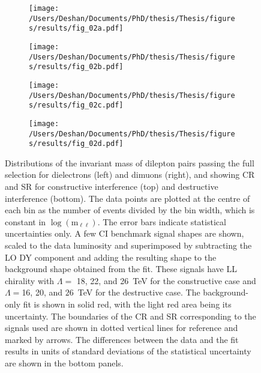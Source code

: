 \begin{figure}[!htpb]
    \centering
    \begin{subfigure}[b]{0.49\textwidth}
        \centering
        \texttt{[image: /Users/Deshan/Documents/PhD/thesis/Thesis/figures/results/fig\_02a.pdf]}
        \label{fig:fits1}
    \end{subfigure}
    \begin{subfigure}[b]{0.49\textwidth}
        \centering
        \texttt{[image: /Users/Deshan/Documents/PhD/thesis/Thesis/figures/results/fig\_02b.pdf]}
        \label{fig:fits2}
    \end{subfigure}
    \begin{subfigure}[b]{0.49\textwidth}
        \centering
        \texttt{[image: /Users/Deshan/Documents/PhD/thesis/Thesis/figures/results/fig\_02c.pdf]}
        \label{fig:fits3}
    \end{subfigure}
    \begin{subfigure}[b]{0.49\textwidth}
        \centering
        \texttt{[image: /Users/Deshan/Documents/PhD/thesis/Thesis/figures/results/fig\_02d.pdf]}
        \label{fig:fits4}
    \end{subfigure}
    \caption[Distributions of the invariant mass of dilepton pairs passing the full selection for dielectrons and dimuons. Where the background-only fit has been performed in the CR and extrapolated to the signal region.]{
    Distributions of the invariant mass of dilepton pairs passing the full selection for dielectrons (left) and dimuons (right), and showing CR and SR for constructive interference (top) and destructive interference (bottom).
    The data points are plotted at the centre of each bin as the number of events divided by the bin width, which is constant in $\log{(\text{m}_{\ell\ell})}$.
    The error bars indicate statistical uncertainties only.
    A few CI benchmark signal shapes are shown, scaled to the data luminosity and superimposed by subtracting the LO DY component and adding the resulting shape to the background shape obtained from the fit.
    These signals have LL chirality with $\Lambda=$ 18, 22, and 26~TeV for the constructive case and $\Lambda=$16, 20, and $26$~TeV for the destructive case.
    The background-only fit is shown in solid red, with the light red area being its uncertainty.
    The boundaries of the CR and SR corresponding to the signals used are shown in dotted vertical lines for reference and marked by arrows.
    The differences between the data and the fit results in units of standard deviations of the statistical uncertainty are shown in the bottom panels.
    }
    \label{fig:fits}
\end{figure}

